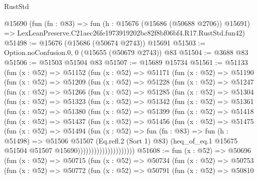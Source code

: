 \begin{lexlean}{RustStd}
\begin{coremodule}
    @15690
    (fun (fn : @83) =>
    fun (h : @15676 (@15686 (@50688 @2706)) @15691) =>
    LexLeanPreserve.C21aec26fe1973919202bc82f8bf06bf4.R17.RustStd.fun42)
@51498 := @15676 (@15686 (@50674 @2743)) @15691
@51503 := Option.noConfusion.{0, 0} (@15655 (@50679 @2743)) @83
@51504 := @3688 @83
@51506 := @51503 @51504 @83
@51507 := @15689 @15734
@51561 := @51133
    (fun (x : @52) =>
    @51152
      (fun (x : @52) =>
      @51171
        (fun (x : @52) =>
        @51190
          (fun (x : @52) =>
          @51209
            (fun (x : @52) =>
            @51228
              (fun (x : @52) =>
              @51247
                (fun (x : @52) =>
                @51266
                  (fun (x : @52) =>
                  @51285
                    (fun (x : @52) =>
                    @51304
                      (fun (x : @52) =>
                      @51323
                        (fun (x : @52) =>
                        @51342
                          (fun (x : @52) =>
                          @51361
                            (fun (x : @52) =>
                            @51380
                              (fun (x : @52) =>
                              @51399
                                (fun (x : @52) =>
                                @51418
                                  (fun (x : @52) =>
                                  @51437
                                    (fun (x : @52) =>
                                    @51456
                                      (fun (x : @52) =>
                                      @51475
                                        (fun (x : @52) =>
                                        @51494
                                          (fun (x : @52) =>
                                          fun (fn : @83) =>
                                          fun (h : @51498) =>
                                          @51506
                                            @51507
                                            (Eq.refl.{2} (Sort 1) @83)
                                            (heq_of_eq.{1}
                                              @15675
                                              @51504
                                              @51507
                                              @15690)))))))))))))))))))))
@51608 := fun (x : @52) =>
  @50696
    (fun (x : @52) =>
    @50715
      (fun (x : @52) =>
      @50734
        (fun (x : @52) =>
        @50753
          (fun (x : @52) =>
          @50772
            (fun (x : @52) =>
            @50791
              (fun (x : @52) =>
              @50810

\end{coremodule}
\end{lexlean}
